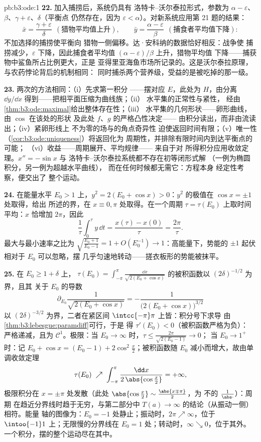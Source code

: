 \begin{solution}{pb:b3:ode:1}
\textbf{22.} 加入捕捞后，系统仍具有
洛特卡–沃尔泰拉形式，参数为 $\alpha -
\varepsilon$、$\beta$、$\gamma + \varepsilon$、$\delta$（平衡点
仍然存在，因为 $\varepsilon <
\alpha$）。对新系统应用第 21 题的结果：
\[
\bar x = \frac{\gamma + \varepsilon}{\delta}
\ \ (\text{猎物平均值上升}),
\qquad
\bar y = \frac{\alpha - \varepsilon}{\beta}
\ \ (\text{捕食者平均值下降}) :
\]
不加选择的捕捞使平衡向
猎物一侧偏移。达·安科纳的数据恰好相反：战争使
捕捞减少，$\varepsilon$ 下降，因此捕食者平均值
$(\alpha - \varepsilon)/\beta$ 上升，猎物平均值
下降——捕获物中鲨鱼所占比例更大，正是
亚得里亚海鱼市场所记录的。这是沃尔泰拉原理，
与农药悖论背后的机制相同：
同时捕杀两个营养级，受益的是被吃掉的那一级。

\textbf{23.} 两次的方法相同：（i）先求第一积分
——摆对应 $E$，此处为 $H$，由分离
$\dd y/\dd x$ 得到——把相平面压缩为曲线族；（ii）
水平集的正常性与紧性，
经由\cref{thm:b3:ode:maximal}给出整体存在性；（iii）
水平集的几何形状——卵形曲线，由 $\cos$ 在该处的形状
及此处 $f$、$g$ 的严格凸性决定——
由积分读出，而非由流读出；（iv）紧卵形线上
不为零的场与的角点奇异性
迫使返回时间有限；（v）唯一性
（\cref{cor:b3:ode:uniqueness}）将返回化为
周期性，并排除有限时间内到达平衡点的可能；
（vi）收益——周期展开、平均规律——
来自于对
所得积分应用收敛定理。$x'' = -\sin x$ 与
洛特卡–沃尔泰拉系统都不存在初等闭形式解
（一例为椭圆积分，另一例为超越水平曲线），
而在任何时候都无需它：方程本身
经定性考察，便交出了
整个运动。

\textbf{24.} 在能量水平 $E_0 > 1$ 上，$y^2 = 2(E_0 +
\cos x) > 0$：$y^2$ 的极值在 $\cos x = \pm1$ 处取得，给出
所述的界，在 $x \equiv 0, \pi$ 处取得。在一个周期
$\tau = \tau(E_0)$ 上取时间平均：$x$ 恰增加
$2\pi$，因此
\[
\frac1\tau\int_0^\tau y\,\dd t = \frac{x(\tau) -
x(0)}{\tau} = \frac{2\pi}\tau .
\]
最大与最小速率之比为 $\sqrt{\frac{E_0 + 1}{E_0 -
1}} = 1 + O(E_0^{-1}) \to 1$：高能量下，势能的
$\pm1$ 起伏相对于 $E_0$ 可以忽略，摆
几乎匀速地转动——搓衣板形的势能被抹平。

\textbf{25.} 在 $E_0 \geq 1 + \delta$ 上，
$\tau(E_0) = \int_{-\pi}^{\pi}\frac{\dd x}{\sqrt{2(E_0 +
\cos x)}}$ 的被积函数以 $(2\delta)^{-1/2}$ 为界，且其
关于 $E_0$ 的导数
\[
\partial_{E_0}\frac1{\sqrt{2(E_0 + \cos x)}}
= -\frac{1}{\bigl(2(E_0 + \cos x)\bigr)^{3/2}}
\]
以 $(2\delta)^{-3/2}$ 为界，二者在紧区间
$\intcc{-\pi}\pi$ 上皆：积分号下求导
由\cref{thm:b3:lebesgue:paramdiff}可行，于是
得 $\tau'(E_0) < 0$（被积函数严格为负）：
严格递减，且为 $\mathcal C^1$。极限：当 $E_0 \to
\infty$ 时，$\tau \leq \frac{2\pi}{\sqrt{2(E_0 - 1)}} \to 0$；
当 $E_0 \to 1^+$ 时：记 $E_0 + \cos x = (E_0 - 1) +
2\cos^2\frac x2$；被积函数随 $E_0$
减小而增大，故由单调收敛定理
\[
\tau(E_0) \;\nearrow\;
\int_{-\pi}^{\pi}\frac{\dd x}{2\,\abs{\cos\frac x2}}
= +\infty,
\]
极限积分在 $x = \pm\pi$ 处发散（此处
$\abs{\cos\frac x2} \sim \frac{\abs{x \mp \pi}}2$，为
不的 $\frac1{\abs\cdot}$）：周期
在趋近分界线时趋于无穷，与第二部分中 $T(a) \to
\infty$ 的结论（从振动一侧）相符。能量
轴的图像为：$E_0 = -1$ 处静止；振动时，$2\pi \nearrow
\infty$，位于 $\intoo{-1}1$ 上；无限慢的分界线在
$E_0 = 1$ 处；转动时，$\infty \searrow 0$，位于其外。
一个积分，摆的整个运动尽在其中。
\end{solution}
